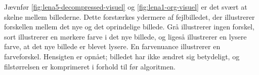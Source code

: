 Jævnfør \ref{fig:lena5-decompressed-visuel} og \ref{fig:lena1-org-visuel} er det svært at skelne mellem billederne. Dette forstærkes ydermere af fejlbilledet, der illustrerer forskellen mellem det nye og det oprindelige billede. Grå illustrerer ingen forskel, sort illustrerer en mørkere farve i det nye billede, og ligeså illustrerer en lysere farve, at det nye billede er blevet lysere. En farvenuance illustrerer en farveforskel. Hensigten er opnået; billedet har ikke ændret sig betydeligt, og filstørrelsen er komprimeret i forhold til før algoritmen.